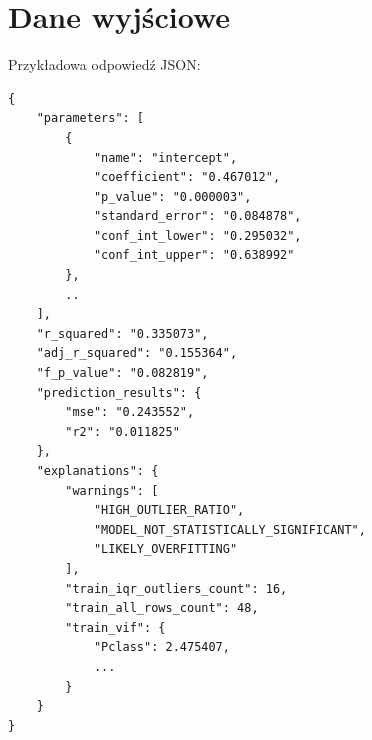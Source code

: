 \documentclass[12pt,a4paper]{article}
\begin{document}
\section{Dane wyjściowe}
Przykładowa odpowiedź JSON:
\begin{verbatim}
{
    "parameters": [
        {
            "name": "intercept",
            "coefficient": "0.467012",
            "p_value": "0.000003",
            "standard_error": "0.084878",
            "conf_int_lower": "0.295032",
            "conf_int_upper": "0.638992"
        },
        ..
    ],
    "r_squared": "0.335073",
    "adj_r_squared": "0.155364",
    "f_p_value": "0.082819",
    "prediction_results": {
        "mse": "0.243552",
        "r2": "0.011825"
    },
    "explanations": {
        "warnings": [
            "HIGH_OUTLIER_RATIO",
            "MODEL_NOT_STATISTICALLY_SIGNIFICANT",
            "LIKELY_OVERFITTING"
        ],
        "train_iqr_outliers_count": 16,
        "train_all_rows_count": 48,
        "train_vif": {
            "Pclass": 2.475407,
            ...
        }
    }
}
\end{verbatim}
\end{document}
